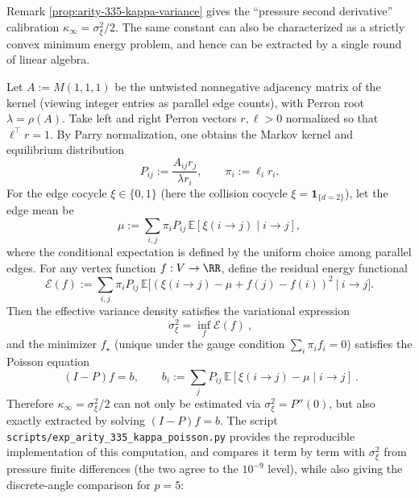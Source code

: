 \begin{remark}\label{rem:arity-335-kappa-poisson}
Remark \ref{prop:arity-335-kappa-variance} gives the ``pressure second derivative'' calibration \(\kappa_\infty=\sigma_\xi^2/2\).
The same constant can also be characterized as a strictly convex minimum energy problem, and hence can be extracted by a single round of linear algebra.
\par
Let \(A:=M(1,1,1)\) be the untwisted nonnegative adjacency matrix of the kernel (viewing integer entries as parallel edge counts), with Perron root \(\lambda=\rho(A)\).
Take left and right Perron vectors \(r,\ell>0\) normalized so that \(\ell^\top r=1\).
By Parry normalization, one obtains the Markov kernel and equilibrium distribution
$$
P_{ij}:=\frac{A_{ij}r_j}{\lambda r_i},\qquad \pi_i:=\ell_i r_i.
$$
For the edge cocycle \(\xi\in\{0,1\}\) (here the collision cocycle \(\xi=\mathbf{1}_{\{d=2\}}\)), let the edge mean be
$$
\mu:=\sum_{i,j}\pi_iP_{ij}\,\mathbb{E}[\xi(i\to j)\mid i\to j],
$$
where the conditional expectation is defined by the uniform choice among parallel edges.
For any vertex function \(f:V\to\RR\), define the residual energy functional
$$
\mathcal{E}(f):=\sum_{i,j}\pi_iP_{ij}\,\mathbb{E}\Big[(\xi(i\to j)-\mu+f(j)-f(i))^2\ \big|\ i\to j\Big].
$$
Then the effective variance density satisfies the variational expression
$$
\boxed{\ \sigma_\xi^2=\inf_f\mathcal{E}(f)\ },
$$
and the minimizer \(f_\star\) (unique under the gauge condition \(\sum_i\pi_if_i=0\)) satisfies the Poisson equation
$$
\boxed{\ (I-P)f=b,\qquad b_i:=\sum_jP_{ij}\,\mathbb{E}[\xi(i\to j)-\mu\mid i\to j]\ }.
$$
Therefore \(\kappa_\infty=\sigma_\xi^2/2\) can not only be estimated via \(\sigma_\xi^2=P''(0)\), but also exactly extracted by solving \((I-P)f=b\).
The script \texttt{scripts/exp\_arity\_335\_kappa\_poisson.py} provides the reproducible implementation of this computation, and compares it term by term with \(\sigma_\xi^2\) from pressure finite differences (the two agree to the \(10^{-9}\) level), while also giving the discrete-angle comparison for \(p=5\):

\end{remark}

